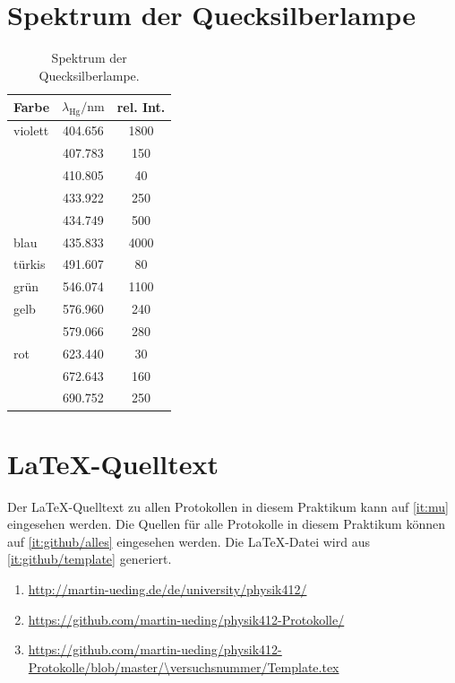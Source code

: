 \FloatBarrier
\begin{appendix}
    \section{Spektrum der Quecksilberlampe}
    \label{sec:spektrum}

    \begin{table}[htbp]
        \centering
        \begin{tabular}{lSS}
            Farbe & {$\lambda_\text{Hg} / \si{\nano\meter}$} & {rel. Int.} \\
            \hline
            violett & 404.656 & 1800 \\
                    & 407.783 & 150 \\
                    & 410.805 & 40 \\
                    & 433.922 & 250 \\
                    & 434.749 & 500 \\
            blau & 435.833 & 4000 \\
            türkis & 491.607 & 80 \\
            grün & 546.074 & 1100 \\
            gelb & 576.960 & 240 \\
                 & 579.066 & 280 \\
            rot & 623.440 & 30 \\
                & 672.643 & 160 \\
                & 690.752 & 250
        \end{tabular}
        \caption{%
            Spektrum der Quecksilberlampe.
            \cite[P402.6.1]{physik412-Anleitung}
        }
        \label{tab:messdaten:gitterkonstante}
    \end{table}

    \section{\LaTeX-Quelltext}

    Der \LaTeX-Quelltext zu allen Protokollen in diesem Praktikum kann auf
    \ref{it:mu} eingesehen werden. Die Quellen für alle Protokolle in diesem
    Praktikum können auf \ref{it:github/alles} eingesehen werden. Die
    \LaTeX-Datei wird aus \ref{it:github/template} generiert.

    \begin{enumerate}
        \item
            \label{it:mu}
            \url{http://martin-ueding.de/de/university/physik412/}
        \item
            \label{it:github/alles}
            \url{https://github.com/martin-ueding/physik412-Protokolle/}
        \item
            \label{it:github/template}
            \url{https://github.com/martin-ueding/physik412-Protokolle/blob/master/\versuchsnummer/Template.tex}
    \end{enumerate}
\end{appendix}

